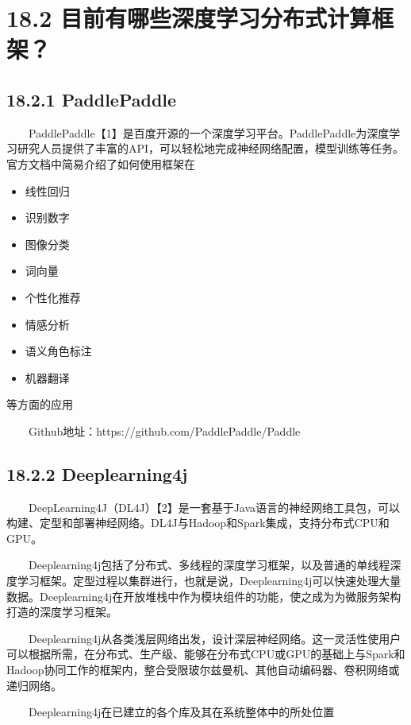 \section{18.2
目前有哪些深度学习分布式计算框架？}\label{ux76eeux524dux6709ux54eaux4e9bux6df1ux5ea6ux5b66ux4e60ux5206ux5e03ux5f0fux8ba1ux7b97ux6846ux67b6}

\subsection{18.2.1 PaddlePaddle}\label{paddlepaddle}

  PaddlePaddle【1】是百度开源的一个深度学习平台。PaddlePaddle为深度学习研究人员提供了丰富的API，可以轻松地完成神经网络配置，模型训练等任务。
官方文档中简易介绍了如何使用框架在

\begin{itemize}
\item
  线性回归
\item
  识别数字
\item
  图像分类
\item
  词向量
\item
  个性化推荐
\item
  情感分析
\item
  语义角色标注
\item
  机器翻译
\end{itemize}

等方面的应用

  Github地址：https://github.com/PaddlePaddle/Paddle

\subsection{18.2.2 Deeplearning4j}\label{deeplearning4j}

  DeepLearning4J（DL4J）【2】是一套基于Java语言的神经网络工具包，可以构建、定型和部署神经网络。DL4J与Hadoop和Spark集成，支持分布式CPU和GPU。

  Deeplearning4j包括了分布式、多线程的深度学习框架，以及普通的单线程深度学习框架。定型过程以集群进行，也就是说，Deeplearning4j可以快速处理大量数据。Deeplearning4j在开放堆栈中作为模块组件的功能，使之成为为微服务架构打造的深度学习框架。

  Deeplearning4j从各类浅层网络出发，设计深层神经网络。这一灵活性使用户可以根据所需，在分布式、生产级、能够在分布式CPU或GPU的基础上与Spark和Hadoop协同工作的框架内，整合受限玻尔兹曼机、其他自动编码器、卷积网络或递归网络。

  Deeplearning4j在已建立的各个库及其在系统整体中的所处位置

